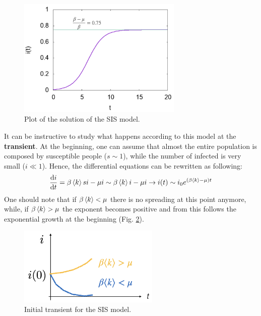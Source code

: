 \documentclass[../main/main.tex]{subfiles}
\begin{document}
\begin{figure}[h!]
\centering
\includegraphics[width=0.7\textwidth]{../lessons/image/03/3.png}
\caption{\label{fig:3_3} Plot of the solution of the SIS model.}
\end{figure}

It can be instructive to study what happens according to this model at the \textbf{transient}. At the beginning, one can assume that almost the entire population is composed by susceptible  people ($ s \sim 1 $), while the number of infected is very small ($ i \ll 1 $).
Hence, the differential equations can be rewritten as following:
\begin{equation*}
  \dv{i}{t} = \beta \expval{k} s i - \mu i \sim \beta \expval{k} i - \mu i \rightarrow i(t) \sim i_0 e^{(\beta \expval{k} - \mu  )t}
\end{equation*}
One should note that if \( \beta \expval{k} < \mu   \) there is no spreading at this point anymore, while, if \( \beta \expval{k} > \mu   \) the exponent becomes positive and from this follows the exponential growth at the beginning (Fig. \ref{fig:3_4}).

\begin{figure}[h!]
\centering
\includegraphics[width=0.6\textwidth]{../lessons/image/03/4.png}
\caption{\label{fig:3_4} Initial transient for the SIS model.}
\end{figure}
\end{document}
